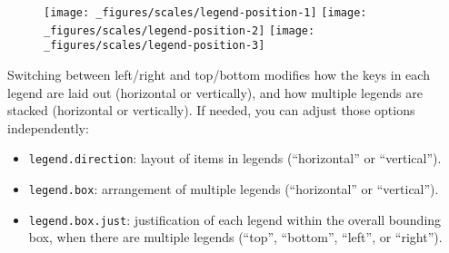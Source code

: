 \begin{Shaded}
\begin{Highlighting}[]
\StringTok{ }\NormalTok{(} \OperatorTok{:}\NormalTok{, } \OperatorTok{:}\NormalTok{, } \NormalTok{(}\NormalTok{, }\NormalTok{, }\NormalTok{))}
\StringTok{ }\OperatorTok{+}\StringTok{ }
\StringTok{  }\NormalTok{(}\NormalTok{(} \NormalTok{) }\OperatorTok{+}\StringTok{ }
\StringTok{  }\NormalTok{(}\NormalTok{) }\OperatorTok{+}\StringTok{ }
\StringTok{  }\NormalTok{(}\NormalTok{)}

\OperatorTok{+}\StringTok{ }\NormalTok{(} \NormalTok{) }
\OperatorTok{+}\StringTok{ }\NormalTok{(} \NormalTok{)}
\OperatorTok{+}\StringTok{ }\NormalTok{(} \NormalTok{)}
\end{Highlighting}
\end{Shaded}

\begin{figure}[H]
  \texttt{[image: \_figures/scales/legend-position-1]}%
  \texttt{[image: \_figures/scales/legend-position-2]}%
  \texttt{[image: \_figures/scales/legend-position-3]}
\end{figure}

Switching between left/right and top/bottom modifies how the keys in
each legend are laid out (horizontal or vertically), and how multiple
legends are stacked (horizontal or vertically). If needed, you can
adjust those options independently:

\begin{itemize}
\item
  \texttt{legend.direction}: layout of items in legends (``horizontal''
  or ``vertical'').
\item
  \texttt{legend.box}: arrangement of multiple legends (``horizontal''
  or ``vertical'').
\item
  \texttt{legend.box.just}: justification of each legend within the
  overall bounding box, when there are multiple legends (``top'',
  ``bottom'', ``left'', or ``right'').
\end{itemize}

